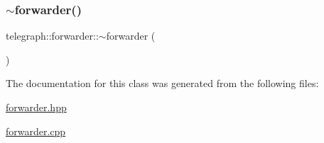 \subsubsection{\texorpdfstring{$\sim$forwarder()}{~forwarder()}}
{\footnotesize\ttfamily telegraph\+::forwarder\+::$\sim$forwarder (\begin{DoxyParamCaption}{ }\end{DoxyParamCaption})}



The documentation for this class was generated from the following files\+:\begin{DoxyCompactItemize}
\item 
\hyperlink{forwarder_8hpp}{forwarder.\+hpp}\item 
\hyperlink{forwarder_8cpp}{forwarder.\+cpp}\end{DoxyCompactItemize}
